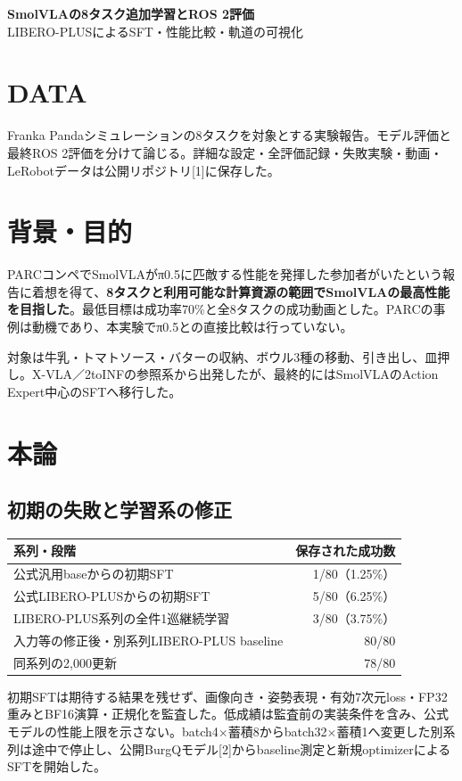\documentclass[paper=a4,fontsize=10pt,baselineskip=15pt]{jlreq}
\begin{document}
\begin{center}
{\LARGE\bfseries SmolVLAの8タスク追加学習とROS 2評価}\\[5pt]
{\large LIBERO-PLUSによるSFT・性能比較・軌道の可視化}
\end{center}
\section{DATA}
Franka Pandaシミュレーションの8タスクを対象とする実験報告。モデル評価と最終ROS 2評価を分けて論じる。詳細な設定・全評価記録・失敗実験・動画・LeRobotデータは公開リポジトリ[1]に保存した。
\section{背景・目的}
PARCコンペでSmolVLAがπ0.5に匹敵する性能を発揮した参加者がいたという報告に着想を得て、\textbf{8タスクと利用可能な計算資源の範囲でSmolVLAの最高性能を目指した}。最低目標は成功率70\%と全8タスクの成功動画とした。PARCの事例は動機であり、本実験でπ0.5との直接比較は行っていない。

対象は牛乳・トマトソース・バターの収納、ボウル3種の移動、引き出し、皿押し。X-VLA／2toINFの参照系から出発したが、最終的にはSmolVLAのAction Expert中心のSFTへ移行した。
\section{本論}
\subsection{初期の失敗と学習系の修正}
\begin{center}
\begin{tabular}{@{}lr@{}}\toprule
系列・段階 & 保存された成功数 \\\midrule
公式汎用baseからの初期SFT & 1/80（1.25\%）\\
公式LIBERO-PLUSからの初期SFT & 5/80（6.25\%）\\
LIBERO-PLUS系列の全件1巡継続学習 & 3/80（3.75\%）\\
入力等の修正後・別系列LIBERO-PLUS baseline & 80/80\\
同系列の2,000更新 & 78/80\\\bottomrule
\end{tabular}
\end{center}
初期SFTは期待する結果を残せず、画像向き・姿勢表現・有効7次元loss・FP32重みとBF16演算・正規化を監査した。低成績は監査前の実装条件を含み、公式モデルの性能上限を示さない。batch4×蓄積8からbatch32×蓄積1へ変更した別系列は途中で停止し、公開BurgQモデル[2]からbaseline測定と新規optimizerによるSFTを開始した。
\end{document}
